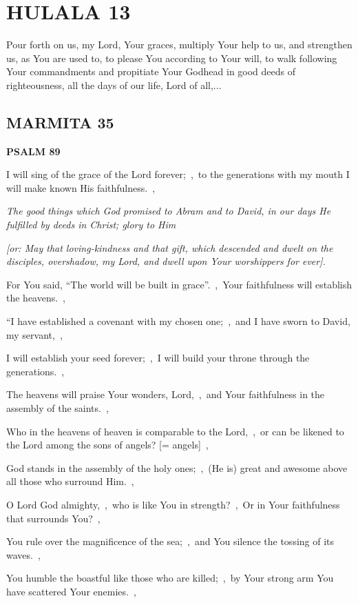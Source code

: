 \documentclass[12pt,twoside,a5paper]{article}
\newcommand{\hulala}[1]{\section*{HULALA {#1}}}
\newcommand{\marmita}[1]{\subsection*{MARMITA {#1}}}
\newcommand{\psalm}[1]{\textbf{PSALM {#1}}\nopagebreak}
\newcommand{\qanona}[1]{{\liturgicalhint{Qanona.} \emph{#1}}}
\newcommand{\slota}[1]{\liturgicalhint{Slota.} #1}
\newcommand{\translationoption}[1]{\emph{or:} #1}
\begin{document}

\hulala{13}

\slota{Pour forth on us, my Lord, Your graces, multiply Your help to us, and strengthen us, as You are used to, to please You according to Your will, to walk following Your commandments and propitiate Your Godhead in good deeds of righteousness, all the days of our life, Lord of all,...}

\marmita{35}

\psalm{89}

\begin{normalparskip}
  I will sing of the grace of the Lord forever;~\sep\ to the generations with my mouth I will make known His faithfulness.~\sep

  \qanona{The good things which God promised to Abram and to David, in our days He fulfilled by deeds in Christ; glory to Him}

  \emph{[\translationoption{May that loving-kindness and that gift, which descended and dwelt on the disciples, overshadow, my Lord, and dwell upon Your worshippers for ever}].}

  For You said, ``The world will be built in grace''.~\sep\ Your faithfulness will establish the heavens.~\sep

  ``I have established a covenant with my chosen one;~\sep\ and I have sworn to David, my servant,~\sep

  I will establish your seed forever;~\sep\ I will build your throne through the generations.~\sep

  The heavens will praise Your wonders, Lord,~\sep\ and Your faithfulness in the assembly of the saints.~\sep

  Who in the heavens of heaven is comparable to the Lord,~\sep\ or can be likened to the Lord among the sons of angels? [= angels]~\sep

  God stands in the assembly of the holy ones;~\sep\ (He is) great and awesome above all those who surround Him.~\sep

  O Lord God almighty,~\sep\ who is like You in strength?~\sep\ Or in Your faithfulness that surrounds You?~\sep

  You rule over the magnificence of the sea;~\sep\ and You silence the tossing of its waves.~\sep

  You humble the boastful like those who are killed;~\sep\ by Your strong arm You have scattered Your enemies.~\sep


\end{normalparskip}
\end{document}
